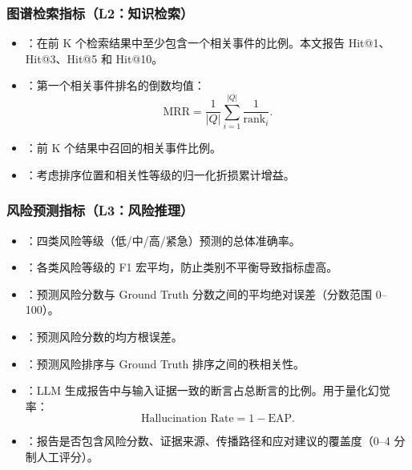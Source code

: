\subsubsection{图谱检索指标（L2：知识检索）}

\begin{itemize}
    \item {}：在前 K 个检索结果中至少包含一个相关事件的比例。本文报告 Hit@1、Hit@3、Hit@5 和 Hit@10。
    \item {}：第一个相关事件排名的倒数均值：
    \begin{equation}
    \text{MRR} = \frac{1}{|Q|}\sum_{i=1}^{|Q|}\frac{1}{\text{rank}_i}.
    \end{equation}
    \item {}：前 K 个结果中召回的相关事件比例。
    \item {}：考虑排序位置和相关性等级的归一化折损累计增益。
\end{itemize}

\subsubsection{风险预测指标（L3：风险推理）}

\begin{itemize}
    \item {}：四类风险等级（低/中/高/紧急）预测的总体准确率。
    \item {}：各类风险等级的 F1 宏平均，防止类别不平衡导致指标虚高。
    \item {}：预测风险分数与 Ground Truth 分数之间的平均绝对误差（分数范围 0--100）。
    \item {}：预测风险分数的均方根误差。
    \item {}：预测风险排序与 Ground Truth 排序之间的秩相关性。
    \item {}：LLM 生成报告中与输入证据一致的断言占总断言的比例。用于量化幻觉率：
    \begin{equation}
    \text{Hallucination Rate} = 1 - \text{EAP}.
    \end{equation}
    \item {}：报告是否包含风险分数、证据来源、传播路径和应对建议的覆盖度（0--4 分制人工评分）。
\end{itemize}

